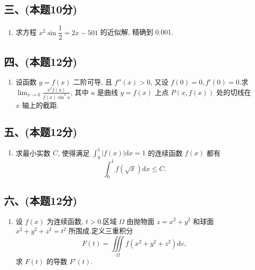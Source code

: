 \subsection*{三、(本题10分)}
\begin{enumerate}[start=7]
    \item 求方程 $x^2 \sin \dfrac{1}{2} = 2x - 501$ 的近似解,  精确到 0.001.
\end{enumerate}

\subsection*{四、(本题12分)}
\begin{enumerate}[start=8]
    \item 设函数 $y = f(x)$ 二阶可导,  且 $f''(x) > 0$,  又设 $f(0) = 0,  f'(0) = 0$.求 $\displaystyle\lim_{x \to 0} \frac{x^3 f(u)}{f(x) \sin^3 u}$,  其中 $u$ 是曲线 $y = f(x)$ 上点 $P(x,  f(x))$ 处的切线在 $x$ 轴上的截距.
\end{enumerate}

\subsection*{五、(本题12分)}
\begin{enumerate}[start=9]
    \item 求最小实数 $C$,  使得满足 $\displaystyle\int_0^1 |f(x)|  \mathrm{d}x = 1$ 的连续函数 $f(x)$ 都有
          \[
              \int_0^1 f(\sqrt{x})  \mathrm{d}x \leqslant C.
          \]
\end{enumerate}

\subsection*{六、(本题12分)}
\begin{enumerate}[start=10]
    \item 设 $f(x)$ 为连续函数,  $t > 0$.区域 $\Omega$ 由抛物面 $z = x^2 + y^2$ 和球面 $x^2 + y^2 + z^2 = t^2$ 所围成.定义三重积分
          \[
              F(t) = \iiint\limits_{\Omega} f(x^2 + y^2 + z^2)  \mathrm{d}v,
          \]
          求 $F(t)$ 的导数 $F'(t)$.
\end{enumerate}

